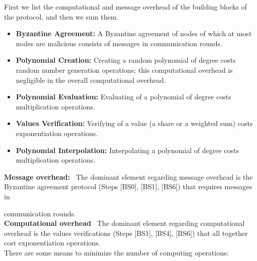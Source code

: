 \documentclass[10pt]{svjour3}
\begin{document}
First we list the computational and message overhead of the
building blocks of the protocol, and then we sum them.

\begin{itemize}
\item \textbf{Byzantine Agreement:} A Byzantine agreement of
 nodes of which at most  nodes are malicious consists of
 messages in  communication rounds.

\item \textbf{Polynomial Creation:} Creating a random polynomial
of degree  costs  random number generation operations;
this computational overhead is negligible in the overall
computational overhead.

\item \textbf{Polynomial Evaluation:} Evaluating of a polynomial
of degree  costs  multiplication operations.

\item \textbf{Values Verification:} Verifying of a value (a share
or a weighted sum) costs  exponentiation operations.

\item \textbf{Polynomial Interpolation:} Interpolating a polynomial of
  degree  costs  multiplication operations.


\end{itemize}


\noindent \textbf{Message overhead:}~ The dominant element
regarding message overhead is the Byzantine agreement protocol
(Steps [BS0], [BS1], [BS6])
that requires  messages in

communication rounds.\\


\noindent \textbf{Computational overhead}~ The dominant element
regarding computational overhead is the values verifications
(Steps [BS1],
[BS4], [BS6])
that all together cost  exponentiation operations.\\








There are some means to minimize the number of computing
operations:
\end{document}
